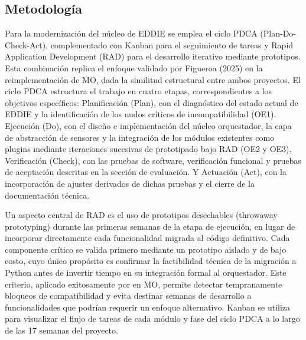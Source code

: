 \subsection{Metodolog\'ia}
Para la modernización del núcleo de EDDIE se emplea el ciclo PDCA (Plan-Do-Check-Act), complementado con Kanban para el seguimiento de tareas y Rapid Application Development (RAD) para el desarrollo iterativo mediante prototipos. Esta combinación replica el enfoque validado por Figueroa (2025) en la reimplementación de MO, dada la similitud estructural entre ambos proyectos. El ciclo PDCA estructura el trabajo en cuatro etapas, correspondientes a los objetivos específicos: Planificación (Plan), con el diagnóstico del estado actual de EDDIE y la identificación de los nudos críticos de incompatibilidad (OE1). Ejecución (Do), con el diseño e implementación del núcleo orquestador, la capa de abstracción de sensores y la integración de los módulos existentes como plugins mediante iteraciones sucesivas de prototipado bajo RAD (OE2 y OE3). Verificación (Check), con las pruebas de software, verificación funcional y pruebas de aceptación descritas en la sección de evaluación. Y Actuación (Act), con la incorporación de ajustes derivados de dichas pruebas y el cierre de la documentación técnica.


Un aspecto central de RAD es el uso de prototipos desechables (throwaway prototyping) durante las primeras semanas de la etapa de ejecución, en lugar de incorporar directamente cada funcionalidad migrada al código definitivo. Cada componente crítico se valida primero mediante un prototipo aislado y de bajo costo, cuyo único propósito es confirmar la factibilidad técnica de la migración a Python antes de invertir tiempo en su integración formal al orquestador. Este criterio, aplicado exitosamente por \cite{figueroa2025arquitectura} en MO, permite detectar tempranamente bloqueos de compatibilidad y evita destinar semanas de desarrollo a funcionalidades que podrían requerir un enfoque alternativo. Kanban se utiliza para visualizar el flujo de tareas de cada módulo y fase del ciclo PDCA a lo largo de las 17 semanas del proyecto.


